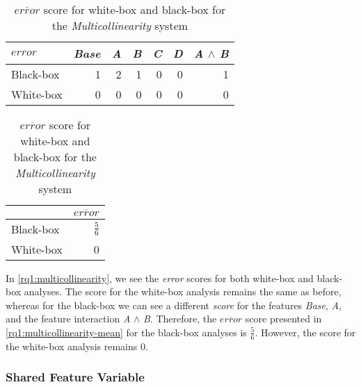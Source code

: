     \begin{table}[H]
        \begin{minipage}{.5\linewidth}
            \centering
            \begin{tabular}{lrrrrrr}    \toprule
            $error$    & \emph{Base} & \emph{A} & \emph{B} & \emph{C} & \emph{D} & \emph{A} $\land$ \emph{B}   \\ \midrule
            Black-box & 1 & 2 & 1 & 0 & 0 & 1      \\
            White-box & 0 & 0 & 0 & 0 & 0 & 0      \\ \bottomrule
            \end{tabular}
            \caption{Respective \emph{error} scores for white-box and black-box {\perfInfluenceModel}s for the \emph{Multicollinearity} system.}
            \label{rq1:multicollinearity}
        \end{minipage}%
        \hspace{7mm}
    \begin{minipage}{.37\linewidth}
        \centering
        \begin{tabular}{lr}
            \toprule
                        & $\overline{error}$   \\ \midrule
            Black-box & $\frac{5}{6}$              \\
            White-box & 0              \\ \bottomrule
            \end{tabular}
            \caption{$\overline{error}$ score for white-box and black-box for the \emph{Multicollinearity} system}
            \label{rq1:multicollinearity-mean}
        \end{minipage}
    \end{table}

In \autoref{rq1:multicollinearity}, we see the \emph{error} scores for both white-box and black-box analyses. 
The score for the white-box analysis remains the same as before, whereas for the black-box we can see a different \emph{score} for the features \emph{Base}, 
\emph{A}, and the feature interaction \emph{A} $\land$ \emph{B}. 
Therefore, the $\overline{error}$ score presented in \autoref{rq1:multicollinearity-mean} for the black-box analyses is $\frac{5}{6}$. 
However, the score for the white-box analysis remains $0$. 

    \subsubsection*{Shared Feature Variable} %

